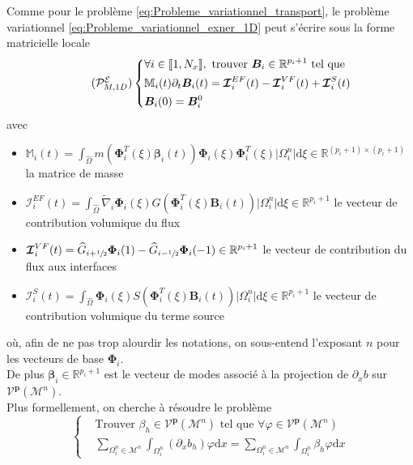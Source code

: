 \documentclass[11pt, a4paper, oneside]{report}
\begin{document}
Comme pour le problème \eqref{eq:Probleme_variationnel_transport}, le problème variationnel \eqref{eq:Probleme_variationnel_exner_1D} peut s'écrire sous la forme matricielle locale
\begin{equation} \tag{$\mathcal{P}_{M,1D}^\mathcal{E}$} \label{eq:Probleme_matriciel_exner_1D}
    \left \{
    \begin{aligned}
        &\forall i \in \llbracket 1, N_x \rrbracket, \text{ trouver } \bm{B}_i \in \mathbb{R}^{p_i+1} \text{ tel que} \\
        &\mathbb{M}_i(t) \partial_t \bm{B}_i(t) = \bm{\mathcal{I}}_i^{EF}(t) - \bm{\mathcal{I}}_i^{VF}(t) + \bm{\mathcal{I}}_i^S(t) \\
        &\bm{B}_i(0) = \bm{B}_i^0
    \end{aligned}
    \right .
\end{equation}
avec
\begin{itemize}
    \item $\displaystyle \mathbb{M}_i(t) = \int_{\widehat{\Omega}} m \left( \bm{\Phi}_i^T(\xi) \bm{\beta}_i(t) \right) \bm{\Phi}_i (\xi) \bm{\Phi}_i^T(\xi) \lvert \Omega_i^n \rvert \text{d}\xi \in \mathbb{R}^{(p_i+1) \times (p_i+1)}$ la matrice de masse
    \item $\displaystyle \bm{\mathcal{I}}_i^{EF}(t) = \int_{\widehat{\Omega}} \widetilde{\nabla}_i \bm{\Phi}_i(\xi) G \left( \bm{\Phi}_i^T(\xi) \bm{B}_i(t) \right) \lvert \Omega_i^n \rvert \text{d}\xi \in \mathbb{R}^{p_i+1}$ le vecteur de contribution volumique du flux
    \item $\displaystyle \bm{\mathcal{I}}_i^{VF}(t) = \widehat{G}_{i + \sfrac{1}{2}} \bm{\Phi}_i(1) - \widehat{G}_{i-\sfrac{1}{2}} \bm{\Phi}_i(-1) \in \mathbb{R}^{p_i+1}$ le vecteur de contribution du flux aux interfaces
    \item $\displaystyle \bm{\mathcal{I}}_i^S(t) = \int_{\widehat{\Omega}} \bm{\Phi}_i(\xi) S \left( \bm{\Phi}_i^T(\xi) \bm{B}_i(t) \right) \lvert \Omega_i^n \rvert \text{d}\xi \in \mathbb{R}^{p_i+1}$ le vecteur de contribution volumique du terme source
\end{itemize}
où, afin de ne pas trop alourdir les notations, on sous-entend l'exposant $n$ pour les vecteurs de base $\bm{\Phi}_i$. \\
De plus $\bm{\beta}_i \in \mathbb{R}^{p_i+1}$ est le vecteur de modes associé à la projection de $\partial_x b$ sur $\mathcal{V}^\mathbf{p}(\mathcal{M}^n)$. \\
Plus formellement, on cherche à résoudre le problème
\begin{equation}
    \left \{
    \begin{aligned}
        &\text{Trouver } \beta_h \in \mathcal{V}^\mathbf{p}(\mathcal{M}^n) \text{ tel que } \forall \varphi \in \mathcal{V}^\mathbf{p}(\mathcal{M}^n) \\
        &\sum_{\Omega_i^n \in \mathcal{M}^n} \int_{\Omega_i^n} (\partial_x b_h) \varphi \text{d}x = \sum_{\Omega_i^n \in \mathcal{M}^n} \int_{\Omega_i^n} \beta_h \varphi \text{d}x
    \end{aligned}
    \right .
\end{equation}
\end{document}
